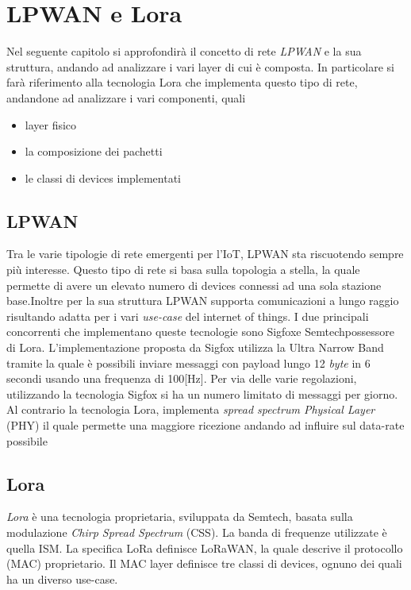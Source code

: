 \chapter{LPWAN e Lora}
Nel seguente capitolo si approfondirà il concetto di rete \emph{LPWAN} e la sua
struttura, andando ad analizzare i vari layer di cui è composta. 
In particolare si farà riferimento alla tecnologia Lora che implementa questo
tipo di rete, andandone ad analizzare i vari componenti, quali
\begin{itemize}
\item layer fisico
\item la composizione dei pachetti 
\item le classi di devices implementati
\end{itemize}

\section{LPWAN}
Tra le varie tipologie di rete emergenti per l'IoT, LPWAN sta riscuotendo sempre
più interesse. Questo tipo di rete si basa sulla topologia a stella, la quale
permette di avere un elevato numero di devices connessi ad una sola stazione
base.Inoltre per la sua struttura LPWAN supporta comunicazioni a lungo raggio
risultando adatta per i vari \emph{use-case} del internet of things. I due
principali concorrenti che implementano queste tecnologie sono Sigfox\tm e
Semtech\tm possessore di Lora\tm. L'implementazione proposta da Sigfox utilizza
la Ultra Narrow Band tramite la quale è possibili inviare messaggi con payload
lungo 12 \emph{byte} in 6 secondi usando una frequenza di 100[Hz]. Per via delle
varie regolazioni, utilizzando la tecnologia Sigfox si ha un numero limitato di
messaggi per giorno.
Al contrario la tecnologia Lora, implementa \emph{spread spectrum Physical
Layer} (PHY) il quale permette una maggiore ricezione andando ad influire sul
data-rate possibile

\section{Lora}
\emph{Lora} è una tecnologia proprietaria, sviluppata da Semtech,  basata sulla 
modulazione \emph{Chirp Spread Spectrum} (CSS). La banda di frequenze utilizzate
è quella ISM. La specifica LoRa definisce LoRaWAN\cite{LoRaWAN101}, la quale
descrive il protocollo (MAC) proprietario. Il MAC layer definisce tre classi di
devices, ognuno dei quali ha un diverso use-case.
